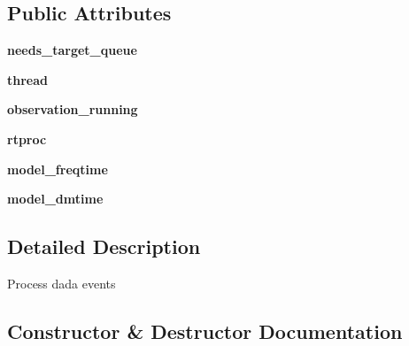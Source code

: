 \subsection*{Public Attributes}
\begin{DoxyCompactItemize}
\item 
\mbox{\label{classdarc_1_1processor_1_1_processor_a69d42114980a6b551607fc7955813f78}} 
{\bfseries needs\+\_\+target\+\_\+queue}
\item 
\mbox{\label{classdarc_1_1processor_1_1_processor_a7d37435dcf100b0ed155311b68e37f52}} 
{\bfseries thread}
\item 
\mbox{\label{classdarc_1_1processor_1_1_processor_a76162d54f18cbade2c313bb2bc7cb5aa}} 
{\bfseries observation\+\_\+running}
\item 
\mbox{\label{classdarc_1_1processor_1_1_processor_a19f015db2eb6cf4ad4974bf214f78171}} 
{\bfseries rtproc}
\item 
\mbox{\label{classdarc_1_1processor_1_1_processor_a65b441f381ec8cee8c152b5f618ee06b}} 
{\bfseries model\+\_\+freqtime}
\item 
\mbox{\label{classdarc_1_1processor_1_1_processor_a26f81ff7d8b9d4c930eb6a4e2ccccfd3}} 
{\bfseries model\+\_\+dmtime}
\end{DoxyCompactItemize}


\subsection{Detailed Description}
\begin{DoxyVerb}Process dada events
\end{DoxyVerb}
 

\subsection{Constructor \& Destructor Documentation}
\mbox{\label{classdarc_1_1processor_1_1_processor_a82610338505fd26f2489149ed62ca282}} 
